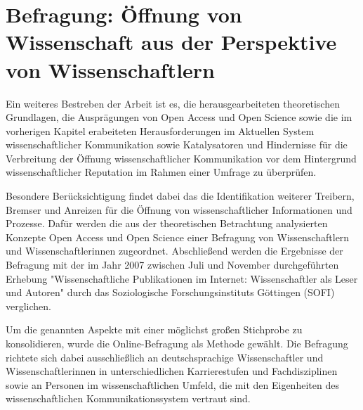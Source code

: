\chapter{Befragung: Öffnung von Wissenschaft aus der Perspektive von Wissenschaftlern}

Ein weiteres Bestreben der Arbeit ist es, die herausgearbeiteten theoretischen Grundlagen, die Ausprägungen von Open Access und Open Science sowie die im vorherigen Kapitel erabeiteten Herausforderungen im Aktuellen System wissenschaftlicher Kommunikation sowie Katalysatoren und Hindernisse für die Verbreitung der Öffnung wissenschaftlicher Kommunikation vor dem Hintergrund wissenschaftlicher Reputation im Rahmen einer Umfrage zu überprüfen.

Besondere Berücksichtigung findet dabei das die Identifikation weiterer Treibern, Bremser und Anreizen für die Öffnung von wissenschaftlicher Informationen und Prozesse. Dafür werden die aus der theoretischen Betrachtung analysierten Konzepte Open Access und Open Science einer Befragung von Wissenschaftlern und Wissenschaftlerinnen zugeordnet. Abschließend werden die Ergebnisse der Befragung mit der im Jahr 2007 zwischen Juli und November durchgeführten Erhebung "Wissenschaftliche Publikationen im Internet: Wissenschaftler als Leser und Autoren" durch das Soziologische Forschungsinstituts Göttingen (SOFI) \cite{hanekop_2008} verglichen.

Um die genannten Aspekte mit einer möglichst großen Stichprobe zu konsolidieren, wurde die Online-Befragung als Methode gewählt. Die Befragung richtete sich dabei ausschließlich an deutschsprachige Wissenschaftler und Wissenschaftlerinnen in unterschiedlichen Karrierestufen und Fachdisziplinen sowie an Personen im wissenschaftlichen Umfeld, die mit den Eigenheiten des wissenschaftlichen Kommunikationssystem vertraut sind.

